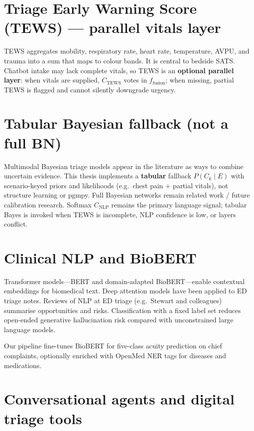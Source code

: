 \section{Triage Early Warning Score (TEWS) --- parallel vitals layer}

TEWS aggregates mobility, respiratory rate, heart rate, temperature, AVPU, and trauma into a sum that maps to colour bands. It is central to bedside SATS. Chatbot intake may lack complete vitals, so TEWS is an \textbf{optional parallel layer}: when vitals are supplied, \(C_{\mathrm{TEWS}}\) votes in \(f_{\mathrm{fusion}}\); when missing, partial TEWS is flagged and cannot silently downgrade urgency.

\section{Tabular Bayesian fallback (not a full BN)}

Multimodal Bayesian triage models appear in the literature as ways to combine uncertain evidence. This thesis implements a \textbf{tabular} fallback \(P(C_k\mid E)\) with scenario-keyed priors and likelihoods (e.g.\ chest pain + partial vitals), not structure learning or pgmpy. Full Bayesian networks remain related work / future calibration research. Softmax \(C_{\mathrm{NLP}}\) remains the primary language signal; tabular Bayes is invoked when TEWS is incomplete, NLP confidence is low, or layers conflict.

\section{Clinical NLP and BioBERT}

Transformer models---BERT and domain-adapted BioBERT---enable contextual embeddings for biomedical text. Deep attention models have been applied to ED triage notes. Reviews of NLP at ED triage (e.g.\ Stewart and colleagues) summarise opportunities and risks. Classification with a fixed label set reduces open-ended generative hallucination risk compared with unconstrained large language models.

Our pipeline fine-tunes BioBERT for five-class acuity prediction on chief complaints, optionally enriched with OpenMed NER tags for diseases and medications.

\section{Conversational agents and digital triage tools}

